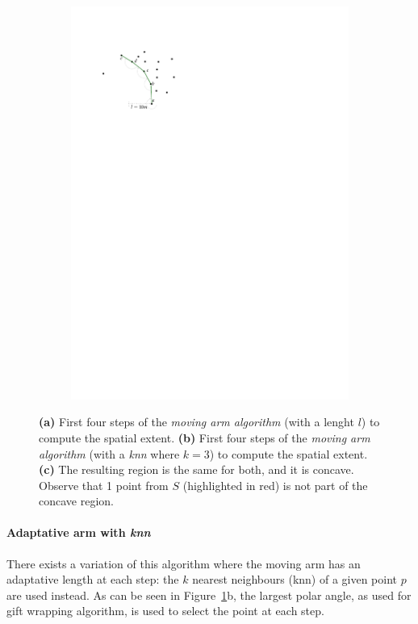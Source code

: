 \begin{figure}
\begin{subfigure}[b]{0.3\linewidth}
    \includegraphics[page=3,width=\textwidth]{figs/movingarm.pdf}
    \caption{}
  \end{subfigure}
  \caption{\textbf{(a)} First four steps of the \emph{moving arm algorithm} (with a lenght $l$) to compute the spatial extent. \textbf{(b)} First four steps of the \emph{moving arm algorithm} (with a \emph{knn} where $k=3$) to compute the spatial extent. \textbf{(c)} The resulting region is the same for both, and it is concave. Observe that 1 point from $S$ (highlighted in red) is not part of the concave region.}
\label{fig:movingarm}
\end{figure}

%

\paragraph{Adaptative arm with \emph{knn}} 
There exists a variation of this algorithm where the moving arm has an adaptative length at each step: the $k$ nearest neighbours (knn) of a given point $p$ are used instead.
As can be seen in Figure~\ref{fig:movingarm}b, the largest polar angle, as used for gift wrapping algorithm, is used to select the point at each step.

